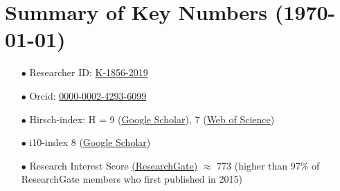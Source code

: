 \documentclass[11pt,a4paper,roman,english,colorlinks,linkcolor={red!50!black}]{moderncv}
\begin{document}
\section{\textbf{Summary of Key Numbers (\today)}}
\begin{enumerate}[leftmargin=0.75cm]
	\item[$\bullet$] Researcher ID: \href{https://www.webofscience.com/wos/author/record/K-1856-2019}{K-1856-2019}
	\item[$\bullet$] Orcid: \href{https://orcid.org/0000-0002-4293-6099}{0000-0002-4293-6099}
	\item[$\bullet$] Hirsch-index: H = 9 (\href{https://scholar.google.com/citations?hl=en&user=67aQviYAAAAJ}{Google Scholar}), 7 (\href{https://www.webofscience.com/wos/author/record/K-1856-2019}{Web of Science})
	\item[$\bullet$] i10-index 8 (\href{https://scholar.google.com/citations?hl=en&user=67aQviYAAAAJ}{Google Scholar})
	\item[$\bullet$] Research Interest Score \href{https://www.researchgate.net/profile/Vatsal-Sanjay-2}{(ResearchGate)} $\approx$ 773 (higher than 97\% of ResearchGate members who first published in 2015)
\end{enumerate}
\end{document}
